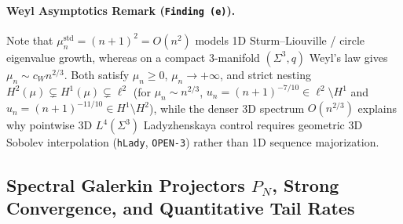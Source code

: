 \paragraph{Weyl Asymptotics Remark (\texttt{Finding (e)}).}
Note that $\mu_n^{\mathrm{std}} = (n+1)^2 = O(n^2)$ models 1D Sturm--Liouville / circle eigenvalue growth, whereas on a compact 3-manifold $(\Sigma^3, q)$ Weyl's law gives $\mu_n \sim c_W n^{2/3}$. Both satisfy $\mu_n \ge 0$, $\mu_n \to +\infty$, and strict nesting $H^2(\mu) \subsetneq H^1(\mu) \subsetneq \ell^2$ (for $\mu_n \sim n^{2/3}$, $u_n = (n+1)^{-7/10} \in \ell^2 \setminus H^1$ and $u_n = (n+1)^{-11/10} \in H^1 \setminus H^2$), while the denser 3D spectrum $O(n^{2/3})$ explains why pointwise 3D $L^4(\Sigma^3)$ Ladyzhenskaya control requires geometric 3D Sobolev interpolation (\texttt{hLady}, \texttt{OPEN-3}) rather than 1D sequence majorization.

\subsection{Spectral Galerkin Projectors $P_N$, Strong Convergence, and Quantitative Tail Rates}

